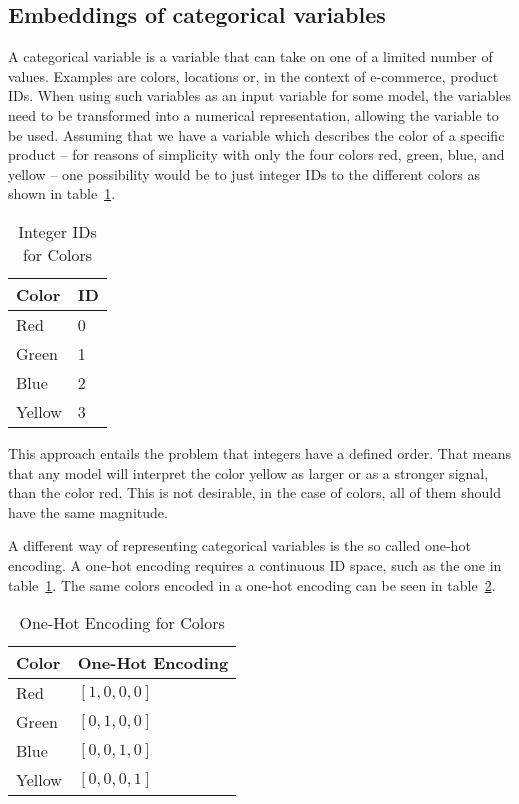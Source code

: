 \subsection{Embeddings of categorical variables}
A categorical variable is a variable that can take on one of a limited number of values.
Examples are colors, locations or, in the context of e-commerce, product IDs.
When using such variables as an input variable for some model, the variables need to be transformed into a numerical representation, allowing the variable to be used.
Assuming that we have a variable which describes the color of a specific product -- for reasons of simplicity with only the four colors red, green, blue, and yellow -- one possibility would be to just integer IDs to the different colors as shown in table~\ref{tab:id_encoding}.
\begin{table}[ht]
    \centering
    \begin{tabular}{ll}\toprule
    \textbf{Color} & \textbf{ID} \\ \midrule
    Red & 0 \\
    Green & 1 \\
    Blue & 2 \\
    Yellow & 3 \\ \bottomrule
    \end{tabular}
    \caption{Integer IDs for Colors}
    \label{tab:id_encoding}
\end{table}
This approach entails the problem that integers have a defined order.
That means that any model will interpret the color yellow as larger or as a stronger signal, than the color red.
This is not desirable, in the case of colors, all of them should have the same magnitude.
\par
A different way of representing categorical variables is the so called one-hot encoding.
A one-hot encoding requires a continuous ID space, such as the one in table~\ref{tab:id_encoding}.
The same colors encoded in a one-hot encoding can be seen in table~\ref{tab:one_hot_encoding}.
\begin{table}[ht]
    \centering
    \begin{tabular}{ll}\toprule
        \textbf{Color} & \textbf{One-Hot Encoding} \\ \midrule
    Red & $[1,0,0,0]$ \\
    Green & $[0,1,0,0]$ \\
    Blue & $[0,0,1,0]$ \\
    Yellow & $[0,0,0,1]$ \\ \bottomrule
    \end{tabular}
    \caption{One-Hot Encoding for Colors}
    \label{tab:one_hot_encoding}
\end{table}

